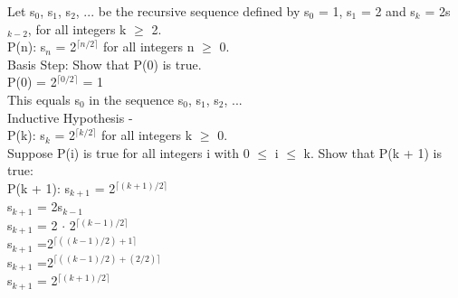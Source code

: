 \documentclass{article}
\begin{document}
Let s$_0$, s$_1$, s$_2$, ... be the recursive sequence defined by s$_0$ = 1, s$_1$ = 2 and s$_k$ = 2s$_{k - 2}$, for all integers k $\geq$ 2. \\
P(n): s$_n$ = 2$^{\lceil {n/2} \rceil}$ for all integers n $\geq$ 0. \\
Basis Step: Show that P(0) is true. \\
P(0) = 2$^{\lceil 0/2 \rceil}$ = 1  {\Large \checkmark}\\
This equals s$_0$ in the sequence s$_0$, s$_1$, s$_2$, ... \\
Inductive Hypothesis - \\
P(k): s$_k$ = 2$^{\lceil {k/2} \rceil}$ for all integers k $\geq$ 0. \\
Suppose P(i) is true for all integers i with 0 $\leq$ i $\leq$ k. Show that P(k + 1) is true: \\
P(k + 1): s$_{k + 1}$ = 2$^{\lceil {(k + 1)/2} \rceil}$ \\
s$_{k + 1}$ = 2s$_{k - 1}$ \\
s$_{k + 1}$ = 2 $\cdot$ 2$^{\lceil {(k - 1)/2} \rceil}$\\
s$_{k + 1}$ =2$^{\lceil {((k - 1)/2) + 1} \rceil}$\\
s$_{k + 1}$ =2$^{\lceil {((k - 1)/2) + (2/2)} \rceil}$\\
s$_{k + 1}$ = 2$^{\lceil {(k + 1)/2} \rceil}$ {\Large \checkmark}\\
\end{document}
